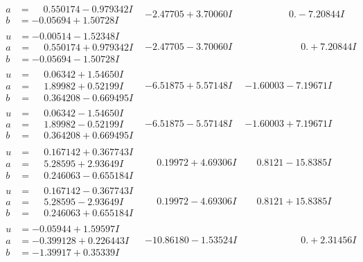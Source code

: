 \documentclass[1p]{elsarticle_modified}
\theoremstyle{definition}
\begin{document}
$$\begin{array}{c|c|c}
\begin{aligned}
a &= \phantom{-}0.550174 - 0.979342 I \\
b &= -0.05694 + 1.50728 I\end{aligned}
 & -2.47705 + 3.70060 I & \phantom{-0.000000 } 0. - 7.20844 I \\ \hline\begin{aligned}
u &= -0.00514 - 1.52348 I \\
a &= \phantom{-}0.550174 + 0.979342 I \\
b &= -0.05694 - 1.50728 I\end{aligned}
 & -2.47705 - 3.70060 I & \phantom{-0.000000 -}0. + 7.20844 I \\ \hline\begin{aligned}
u &= \phantom{-}0.06342 + 1.54650 I \\
a &= \phantom{-}1.89982 + 0.52199 I \\
b &= \phantom{-}0.364208 - 0.669495 I\end{aligned}
 & -6.51875 + 5.57148 I & -1.60003 - 7.19671 I \\ \hline\begin{aligned}
u &= \phantom{-}0.06342 - 1.54650 I \\
a &= \phantom{-}1.89982 - 0.52199 I \\
b &= \phantom{-}0.364208 + 0.669495 I\end{aligned}
 & -6.51875 - 5.57148 I & -1.60003 + 7.19671 I \\ \hline\begin{aligned}
u &= \phantom{-}0.167142 + 0.367743 I \\
a &= \phantom{-}5.28595 + 2.93649 I \\
b &= \phantom{-}0.246063 - 0.655184 I\end{aligned}
 & \phantom{-}0.19972 + 4.69306 I & \phantom{-}0.8121 - 15.8385 I \\ \hline\begin{aligned}
u &= \phantom{-}0.167142 - 0.367743 I \\
a &= \phantom{-}5.28595 - 2.93649 I \\
b &= \phantom{-}0.246063 + 0.655184 I\end{aligned}
 & \phantom{-}0.19972 - 4.69306 I & \phantom{-}0.8121 + 15.8385 I \\ \hline\begin{aligned}
u &= -0.05944 + 1.59597 I \\
a &= -0.399128 + 0.226443 I \\
b &= -1.39917 + 0.35339 I\end{aligned}
 & -10.86180 - 1.53524 I & \phantom{-0.000000 -}0. + 2.31456 I \\ \hline\begin{aligned}

\end{aligned}
\end{array}$$
\end{document}
